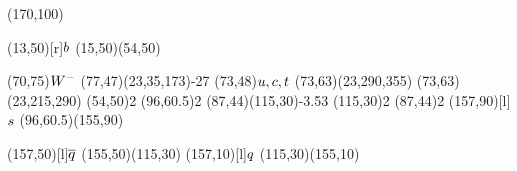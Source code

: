 \documentclass{standalone}
\begin{document}
\begin{axopicture}(170,100)

  \Text(13,50)[r]{${b}$}                     %
  \Line[arrow](15,50)(54,50)                     %
                                                 
  \Text(70,75){\small{${W^-}$}}                    %
  \PhotonArc(77,47)(23,35,173){-2}{7}            %
  \Text(73,48){${u}, {c}, {t}$}      %
  \Arc[arrow,arrowpos=0.60](73,63)(23,290,355)   %
  \Arc[arrow,arrowpos=0.60](73,63)(23,215,290)   %
  \Vertex(54,50){2}                              %
  \Vertex(96,60.5){2}                            %
  \Gluon(87,44)(115,30){-3.5}{3}                 %
  \Vertex(115,30){2}                             %
  \Vertex(87,44){2}                              %
  \Text(157,90)[l]{${s}$}                    %
  \Line[arrow](96,60.5)(155,90)                  %
                                                 
  \Text(157,50)[l]{${\overline {{q}}}$}                  %
  \Line[arrow](155,50)(115,30)                   %
  \Text(157,10)[l]{${q}$}                     %
  \Line[arrow](115,30)(155,10)                   %
                                                 
\end{axopicture}
\end{document}
